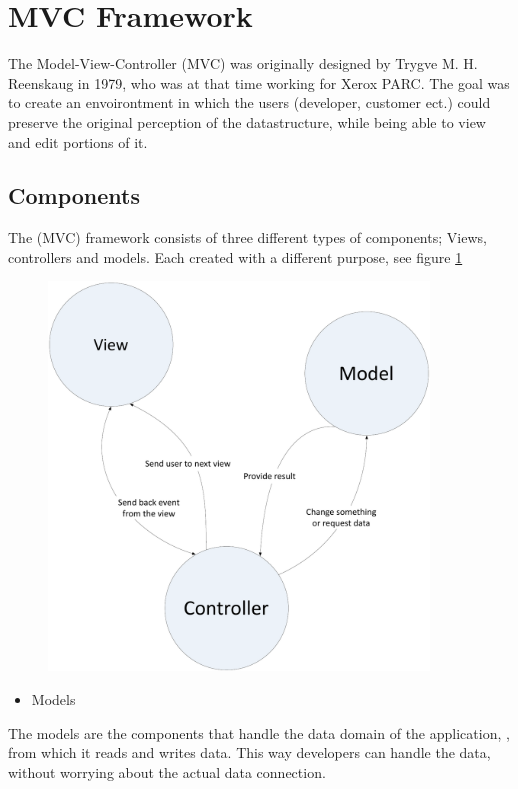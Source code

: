 \section{MVC Framework}
\label{sec:mvc}
The Model-View-Controller (MVC) was originally designed by Trygve M. H. Reenskaug in 1979, who was at that time working for Xerox PARC. The goal was to create an envoirontment in which the users (developer, customer ect.) could preserve the original perception of the datastructure, while being able to view and edit portions of it.

\subsection{Components}

The (MVC) framework consists of three different types of components; Views, controllers and models. Each created with a different purpose, see figure \ref{fig:mvc-drawing}

\begin{figure}[H]
	\centering
		\includegraphics[width=0.90\textwidth]{input/implementation/mvc/mvc.pdf}
	\label{fig:mvc-drawing}
\end{figure}


\begin{itemize}
\item Models
\end{itemize}
The models are the components that handle the data domain of the application, , from which it reads and writes data. This way developers can handle the data, without worrying about the actual data connection.

